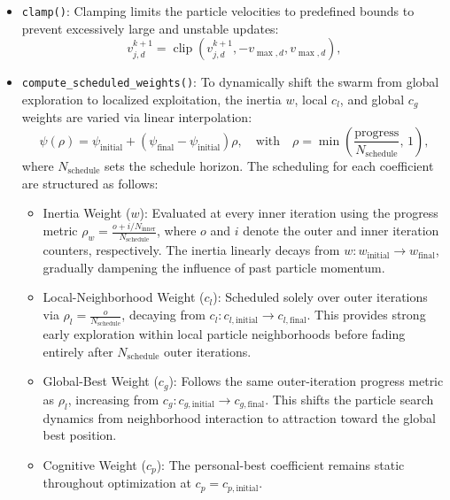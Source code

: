 \begin{itemize}
    \item \texttt{clamp()}: Clamping limits the particle velocities to predefined bounds to prevent excessively large and unstable updates:
    \begin{equation}
        v_{j,d}^{k+1} = \operatorname{clip} \left(v_{j,d}^{k+1}, -v_{\max,d}, v_{\max,d} \right),
    \end{equation}
\item \texttt{compute\_scheduled\_weights()}: To dynamically shift the swarm from global exploration to localized exploitation, the inertia $w$, local $c_l$, and global $c_g$ weights are varied via linear interpolation:
    \begin{equation}
        \psi(\rho) = \psi_{\mathrm{initial}} + \left(\psi_{\mathrm{final}} - \psi_{\mathrm{initial}}\right) \rho, \quad \text{with} \quad \rho = \min\left( \frac{\mathrm{progress}}{N_{\mathrm{schedule}}}, \, 1 \right),
    \end{equation}
    where $N_{\mathrm{schedule}}$ sets the schedule horizon. 
    The scheduling for each coefficient are structured as follows:
    \begin{itemize}
        \item Inertia Weight ($w$): Evaluated at every inner iteration using the progress metric $\rho_w = \frac{o + i / N_{\mathrm{inner}}}{N_{\mathrm{schedule}}}$, where $o$ and $i$ denote the outer and inner iteration counters, respectively. The inertia linearly decays from $w: w_{\mathrm{initial}} \longrightarrow w_{\mathrm{final}}$, gradually dampening the influence of past particle momentum.
        \item Local-Neighborhood Weight ($c_l$): Scheduled solely over outer iterations via $\rho_l = \frac{o}{N_{\mathrm{schedule}}}$, decaying from $c_l: c_{l,\mathrm{initial}} \longrightarrow c_{l,\mathrm{final}}$. This provides strong early exploration within local particle neighborhoods before fading entirely after $N_{\mathrm{schedule}}$ outer iterations.
        \item Global-Best Weight ($c_g$): Follows the same outer-iteration progress metric as $\rho_l$, increasing from $c_g: c_{g,\mathrm{initial}} \longrightarrow c_{g,\mathrm{final}}$. This shifts the particle search dynamics from neighborhood interaction to attraction toward the global best position.
        \item Cognitive Weight ($c_p$): The personal-best coefficient remains static throughout optimization at $c_p = c_{p,\mathrm{initial}}$.
    \end{itemize}    

\end{itemize}

